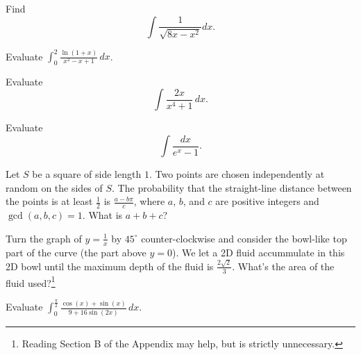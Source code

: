 \documentclass{article}
\begin{document}
\begin{prob}{6}
Find
\[\int \frac{1}{\sqrt{8x-x^2}}dx.\]
\end{prob}

\begin{prob}{6}
Evaluate $\int_0^2\frac{\ln(1+x)}{x^2-x+1}\,dx$.
\end{prob}

\begin{prob}{6}
Evaluate \[\int \frac{2x}{x^4 + 1}\,dx.\]
\end{prob}

\begin{prob}{9}
Evaluate \[\int \frac{dx}{e^x - 1}.\]
\end{prob}

\begin{req}[AMC 10A 2015/25]{9}
Let $S$ be a square of side length $1$.  Two points are chosen independently at random on the sides of $S$.  The probability that the straight-line distance between the points is at least $\tfrac12$ is $\tfrac{a-b\pi}c$, where $a$, $b$, and $c$ are positive integers and $\gcd(a,b,c)=1$.  What is $a+b+c$?
\end{req}

\begin{prob}[SMT 2019/7]{9}
Turn the graph of $y=\frac{1}{x}$ by $45^{\circ}$ counter-clockwise and consider the bowl-like top part of the curve (the part above $y=0$). We let a 2D fluid accummulate in this 2D bowl until the maximum depth of the fluid is $\frac{2\sqrt{2}}{3}.$ What’s the area of the fluid used?\footnote{Reading Section B of the Appendix may help, but is strictly unnecessary.}
\end{prob}

\begin{prob}{9}
Evaluate $\int_0^{\frac{\pi}{2}}\frac{\cos(x)+\sin(x)}{9+16\sin(2x)}\,dx$. %
\end{prob}
\end{document}
